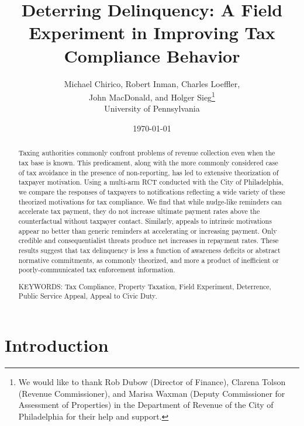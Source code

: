 \documentclass[12pt,titlepage]{article}
\begin{document}
\title{Deterring Delinquency: A Field Experiment in Improving Tax Compliance Behavior}

\author{Michael Chirico, Robert Inman, Charles Loeffler, \\
        John MacDonald, and Holger Sieg\thanks{We would like to
        thank Rob Dubow (Director of Finance), Clarena Tolson (Revenue
        Commissioner), and Marisa Waxman (Deputy Commissioner for
        Assessment of Properties) in the Department of Revenue of the City
        of Philadelphia for their help and support.}  \\
        University of Pennsylvania}

\date{\today}

\maketitle

\begin{abstract}

Taxing authorities commonly confront problems of revenue collection
even when the tax base is known. This predicament, along with the more
commonly considered case of tax avoidance in the presence of non-reporting,
has led to extensive theorization of taxpayer motivation. Using a multi-arm
RCT conducted with the City of Philadelphia, we compare the responses of
taxpayers to notifications reflecting a wide variety of these theorized motivations
for tax compliance. We find that while nudge-like reminders can accelerate
tax payment, they do not increase ultimate payment rates above
the counterfactual without taxpayer contact.
Similarly, appeals to intrinsic motivations appear no better than generic
reminders at accelerating or increasing payment. Only credible and
consequentialist threats produce net increases in repayment rates. These
results suggest that tax delinquency is less a function of awareness
deficits or abstract normative commitments, as commonly theorized, and
more a product of inefficient or poorly-communicated tax enforcement information.

\noindent KEYWORDS: Tax Compliance, Property Taxation, Field
Experiment, Deterrence, Public Service Appeal, Appeal to Civic Duty.

\end{abstract}

\newpage

\section{Introduction}
\end{document}
